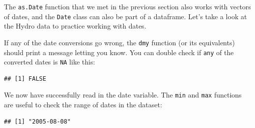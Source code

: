 \documentclass[]{book}
\newenvironment{Shaded}{\begin{snugshade}}{\end{snugshade}}
\newcommand{\CommentTok}[1]{\textcolor[rgb]{0.56,0.35,0.01}{\textit{#1}}}
\newcommand{\KeywordTok}[1]{\textcolor[rgb]{0.13,0.29,0.53}{\textbf{#1}}}
\newcommand{\NormalTok}[1]{#1}
\newcommand{\OperatorTok}[1]{\textcolor[rgb]{0.81,0.36,0.00}{\textbf{#1}}}
\newcommand{\StringTok}[1]{\textcolor[rgb]{0.31,0.60,0.02}{#1}}
\begin{document}
The \texttt{as.Date} function that we met in the previous section also works with vectors of dates, and the \texttt{Date} class can also be part of a dataframe. Let's take a look at the Hydro data to practice working with dates.

\begin{Shaded}
\end{Shaded}

If any of the date conversions go wrong, the \texttt{dmy} function (or its equivalents) should print a message letting you know. You can double check if \texttt{any} of the converted dates is \texttt{NA} like this:

\begin{Shaded}
\end{Shaded}

\begin{verbatim}
## [1] FALSE
\end{verbatim}

We now have successfully read in the date variable. The \texttt{min} and \texttt{max} functions are useful to check the range of dates in the dataset:

\begin{Shaded}
\end{Shaded}

\begin{verbatim}
## [1] "2005-08-08"
\end{verbatim}

\begin{Shaded}
\end{Shaded}
\end{document}
